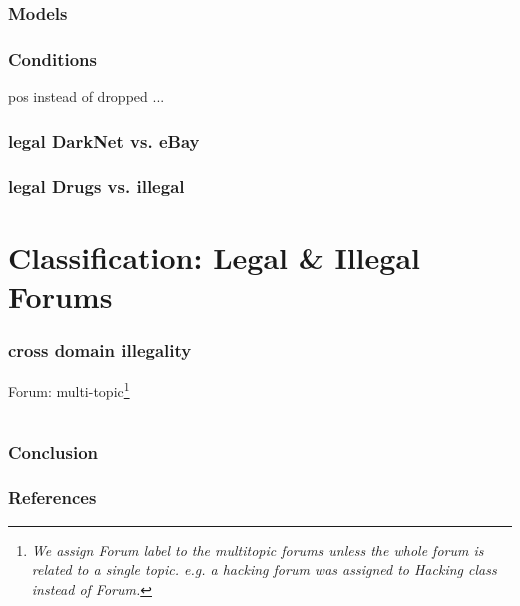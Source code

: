 \documentclass[t,xcolor={svgnames,table}]{beamer}
\begin{document}
\begin{frame}
	\frametitle{Models}
\end{frame}
\begin{frame}
	\frametitle{Conditions}
	pos instead of
	dropped 
	...
\end{frame}

\begin{frame}
	\frametitle{legal DarkNet vs. eBay}
\end{frame}
\begin{frame}
	\frametitle{legal Drugs vs. illegal}
\end{frame}

\section{Classification: Legal \& Illegal Forums}

\begin{frame}
	\frametitle{cross domain illegality}
	Forum: multi-topic\footnote{\textit{We assign Forum label to the multitopic forums unless the whole forum is related to
a single topic. e.g. a hacking forum was assigned
to Hacking class instead of Forum.}} \cite{AlNabki17}
\end{frame}

\section*{}

\begin{frame}
\frametitle{Conclusion}
\end{frame}

\begin{frame}[allowframebreaks]
\frametitle{References}

\tiny
\end{frame}
\end{document}
